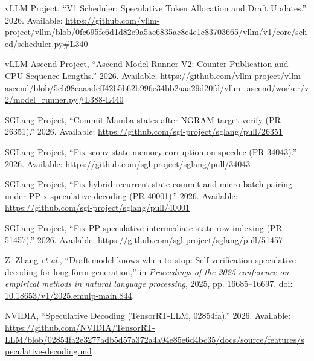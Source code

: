 \documentclass[11pt,a4paper,UTF8,fontset=none,scheme=plain,zihao=-4]{ctexart}
\newenvironment{CSLReferences}[2]{%
  \footnotesize
  \raggedright
  \setlength{\leftskip}{3em}%
  \setlength{\parindent}{-3em}%
  \setlength{\parskip}{0.1\baselineskip}%
  \sloppy
}{}
\newcommand{\CSLLeftMargin}[1]{\makebox[3em][l]{#1}}
\newcommand{\CSLRightInline}[1]{#1}
\begin{document}
\begin{CSLReferences}{0}{0}
\leavevmode{}%
\CSLLeftMargin{{[}75{]} }
\CSLRightInline{vLLM Project, {``{V1 Scheduler: Speculative Token
Allocation and Draft Updates}.''} 2026. Available:
\url{https://github.com/vllm-project/vllm/blob/0fc695fc6d1d82e9a5ac6835ac8e4e1c83703665/vllm/v1/core/sched/scheduler.py\#L340}}

\leavevmode{}%
\CSLLeftMargin{{[}76{]} }
\CSLRightInline{vLLM-Ascend Project, {``{Ascend Model Runner V2: Counter
Publication and CPU Sequence Lengths}.''} 2026. Available:
\url{https://github.com/vllm-project/vllm-ascend/blob/5cb98caaadeff42b5b62b996e34bb2aaa29d20fd/vllm_ascend/worker/v2/model_runner.py\#L388-L440}}

\leavevmode{}%
\CSLLeftMargin{{[}77{]} }
\CSLRightInline{SGLang Project, {``{Commit Mamba states after NGRAM
target verify (PR 26351)}.''} 2026. Available:
\url{https://github.com/sgl-project/sglang/pull/26351}}

\leavevmode{}%
\CSLLeftMargin{{[}78{]} }
\CSLRightInline{SGLang Project, {``{Fix sconv state memory corruption on
specdec (PR 34043)}.''} 2026. Available:
\url{https://github.com/sgl-project/sglang/pull/34043}}

\leavevmode{}%
\CSLLeftMargin{{[}79{]} }
\CSLRightInline{SGLang Project, {``{Fix hybrid recurrent-state commit
and micro-batch pairing under PP x speculative decoding (PR 40001)}.''}
2026. Available: \url{https://github.com/sgl-project/sglang/pull/40001}}

\leavevmode{}%
\CSLLeftMargin{{[}80{]} }
\CSLRightInline{SGLang Project, {``{Fix PP speculative
intermediate-state row indexing (PR 51457)}.''} 2026. Available:
\url{https://github.com/sgl-project/sglang/pull/51457}}

\leavevmode{}%
\CSLLeftMargin{{[}81{]} }
\CSLRightInline{Z. Zhang \emph{et al.}, {``Draft model knows when to
stop: Self-verification speculative decoding for long-form
generation,''} in \emph{Proceedings of the 2025 conference on empirical
methods in natural language processing}, 2025, pp. 16685--16697. doi:
\href{https://doi.org/10.18653/v1/2025.emnlp-main.844}{10.18653/v1/2025.emnlp-main.844}.}

\leavevmode{}%
\CSLLeftMargin{{[}82{]} }
\CSLRightInline{NVIDIA, {``{Speculative Decoding (TensorRT-LLM,
02854fa)}.''} 2026. Available:
\url{https://github.com/NVIDIA/TensorRT-LLM/blob/02854fa2e3277adb5d57a372a4a94e85e6d4bc35/docs/source/features/speculative-decoding.md}}


\end{CSLReferences}
\end{document}
